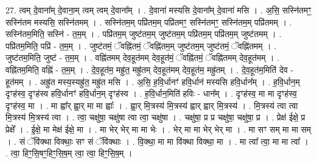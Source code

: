 \documentclass[17pt]{extarticle}
\begin{document}
27. त्वम् दे॒वाना᳚म् दे॒वाना॒म् त्वम् त्वम् दे॒वाना᳚म् । . दे॒वाना॑ मस्यसि दे॒वाना᳚म् दे॒वाना॑ मसि । . अ॒सि॒ सस्नि॑तमꣳ॒॒ सस्नि॑तम मस्यसि॒ सस्नि॑तमम् । . सस्नि॑तम॒म् पप्रि॑तम॒म् पप्रि॑तमꣳ॒॒ सस्नि॑तमꣳ॒॒ सस्नि॑तम॒म् पप्रि॑तमम् । . सस्नि॑तम॒मिति॒ सस्नि॑ - त॒म॒म् । . पप्रि॑तम॒म् जुष्ट॑तम॒म् जुष्ट॑तम॒म् पप्रि॑तम॒म् पप्रि॑तम॒म् जुष्ट॑तमम् । . पप्रि॑तम॒मिति॒ पप्रि॑ - त॒म॒म् । . जुष्ट॑तमं॒ ॅवह्नि॑तमं॒ ॅवह्नि॑तम॒म् जुष्ट॑तम॒म् जुष्ट॑तमं॒ ॅवह्नि॑तमम् । . जुष्ट॑तम॒मिति॒ जुष्ट॑ - त॒म॒म् । . वह्नि॑तमम् देव॒हूत॑मम् देव॒हूत॑मं॒ ॅवह्नि॑तमं॒ ॅवह्नि॑तमम् देव॒हूत॑मम् । . वह्नि॑तम॒मिति॒ वह्नि॑ - त॒म॒म् । . दे॒व॒हूत॑म॒ मह्रु॑त॒ मह्रु॑तम् देव॒हूत॑मम् देव॒हूत॑म॒ मह्रु॑तम् । . दे॒व॒हूत॑म॒मिति॑ देव - हूत॑मम् । . अह्रु॑त मस्य॒स्यह्रु॑त॒ मह्रु॑त मसि । . अ॒सि॒ ह॒वि॒र्धानꣳ॑ हवि॒र्धान॑ मस्यसि हवि॒र्धान᳚म् । . ह॒वि॒र्धान॒म् दृꣳह॑स्व॒ दृꣳह॑स्व हवि॒र्धानꣳ॑ हवि॒र्धान॒म् दृꣳह॑स्व । . ह॒वि॒र्धान॒मिति॑ हविः - धान᳚म् । . दृꣳह॑स्व॒ मा मा दृꣳह॑स्व॒ दृꣳह॑स्व॒ मा । . मा ह्वा᳚र् ह्वा॒र् मा मा ह्वाः᳚ । . ह्वा॒र् मि॒त्रस्य॑ मि॒त्रस्य॑ ह्वार् ह्वार् मि॒त्रस्य॑ । . मि॒त्रस्य॑ त्वा त्वा मि॒त्रस्य॑ मि॒त्रस्य॑ त्वा । . त्वा॒ चक्षु॑षा॒ चक्षु॑षा त्वा त्वा॒ चक्षु॑षा । . चक्षु॑षा॒ प्र प्र चक्षु॑षा॒ चक्षु॑षा॒ प्र । . प्रेक्ष॑ ईक्षे॒ प्र प्रेक्षे᳚ । . ई॒क्षे॒ मा मेक्ष॑ ईक्षे॒ मा । . मा भेर् भेर् मा मा भेः । . भेर् मा मा भेर् भेर् मा । . मा सꣳ सम् मा मा सम् । . सं ॅवि॑क्था विक्थाः॒ सꣳ सं ॅवि॑क्थाः । . वि॒क्था॒ मा मा वि॑क्था विक्था॒ मा । . मा त्वा᳚ त्वा॒ मा मा त्वा᳚ । . त्वा॒ हिꣳ॒॒सि॒षꣳ॒॒हिꣳ॒॒सि॒ष॒म् त्वा॒ त्वा॒ हिꣳ॒॒सि॒ष॒म् । \newline
\end{document}
